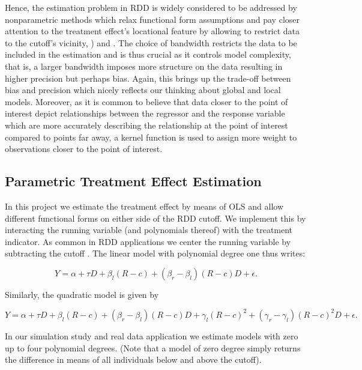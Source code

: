 Hence, the estimation problem in RDD is widely considered to be addressed by nonparametric methods which relax functional form assumptions and pay closer attention to the treatment effect's locational feature by allowing to restrict data to the cutoff's vicinity, \cite{hahn_et_al}) and \cite{lee_lemieux_2010}. The choice of bandwidth restricts the data to be included in the estimation and is thus crucial as it controls model complexity, that is, a larger bandwidth imposes more structure on the data resulting in higher precision but perhaps bias. Again, this brings up the trade-off between bias and precision which nicely reflects our thinking about global and local models. Moreover, as it is common to believe that data closer to the point of interest depict relationships between the regressor and the response variable which are more accurately describing the relationship at the point of interest compared to points far away, a kernel function is used to assign more weight to observations closer to the point of interest.


\subsection{Parametric Treatment Effect Estimation} %
\label{sec: param}
In this project we estimate the treatment effect by means of OLS and allow different functional forms on either side of the RDD cutoff. We implement this by interacting the running variable (and polynomials thereof) with the treatment indicator. As common in RDD applications we center the running variable by subtracting the cutoff \cite{lee_lemieux_2010}. The linear model with polynomial degree one thus writes:

\begin{equation}
Y = \alpha + \tau D + \beta_{l} (R-c) + (\beta_{r} - \beta_{l}) (R-c) D + \epsilon .
\label{eq: model_general}
\end{equation}

Similarly, the quadratic model is given by

\begin{equation}
Y = \alpha + \tau D + \beta_{l} (R-c) + (\beta_{r} - \beta_{l}) (R-c) D + \gamma_{l} (R-c)^2 + (\gamma_{r} - \gamma_{l}) (R-c)^2 D + \epsilon .
\end{equation}

In our simulation study and real data application we estimate models with zero up to four polynomial degrees. (Note that a model of zero degree simply returns the difference in means of all individuals below and above the cutoff).



